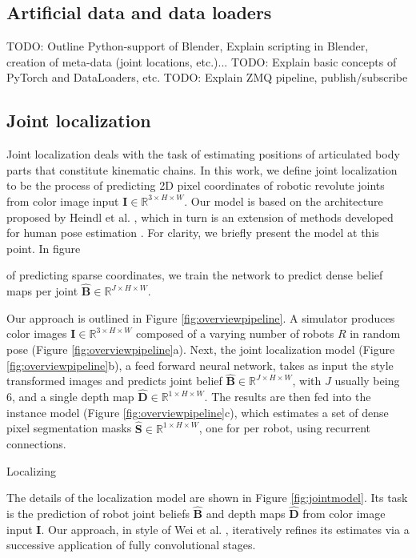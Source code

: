 \documentclass[conference]{IEEEtran}
\begin{document}
\subsection{Artificial data and data loaders}

TODO: Outline Python-support of Blender, Explain scripting in Blender, creation of meta-data (joint locations, etc.)...
TODO: Explain basic concepts of PyTorch and DataLoaders, etc.
TODO: Explain ZMQ pipeline, publish/subscribe

\subsection{Joint localization}

    Joint localization deals with the task of estimating positions of articulated body parts that constitute kinematic chains. In this work, we define joint localization to be the process of predicting 2D pixel coordinates of robotic revolute joints from color image input $\mathbf{I} \in \mathbb{R}^{3 \times H\times W}$. Our model is based on the architecture  proposed by Heindl et al. \cite{cheind2019disp}, which in turn is an extension of methods developed for human pose estimation \cite{cao2017realtime, newell2016stacked}. For clarity, we briefly present the model at this point. In figure 

    of predicting sparse coordinates, we train the network to predict dense belief maps per joint $\hat{\mathbf{B}} \in \mathbb{R}^{J \times H \times W}$.

    Our approach is outlined in Figure \ref{fig:overviewpipeline}. A simulator produces color images $\mathbf{I} \in \mathbb{R}^{3 \times H\times W}$ composed of a varying number of robots $R$ in random pose (Figure \ref{fig:overviewpipeline}a). Next, the joint localization model (Figure \ref{fig:overviewpipeline}b), a feed forward neural network, takes as input the style transformed images and predicts joint belief $\hat{\mathbf{B}} \in \mathbb{R}^{J \times H \times W}$, with $J$ usually being 6, and a single depth map $\hat{\mathbf{D}} \in \mathbb{R}^{1 \times H \times W}$. The results are then fed into the instance model (Figure \ref{fig:overviewpipeline}c), which estimates a set of dense pixel segmentation masks $\hat{\mathbf{S}} \in \mathbb{R}^{1 \times H \times W}$, one for per robot, using recurrent connections.

    Localizing 

    The details of the localization model are shown in Figure \ref{fig:jointmodel}. Its task is the prediction of robot joint beliefs $\hat{\mathbf{B}}$ and depth maps $\hat{\mathbf{D}}$ from color image input $\mathbf{I}$. Our approach, in style of Wei et al. \cite{wei2016convolutional}, iteratively refines its estimates via a successive application of fully convolutional stages. 
\end{document}
